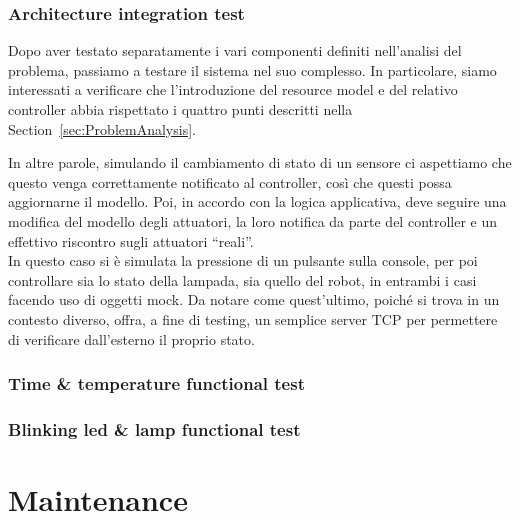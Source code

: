 \documentclass{../llncs}
\newcommand{\labelsec}[1]{\label{sec:#1}}
\newcommand{\xs}[1]{\sectionname~\ref{sec:#1}}
\newcommand{\sectionname}{Section}
\begin{document}


\subsubsection{Architecture integration test}
Dopo aver testato separatamente i vari componenti definiti nell'analisi del problema, passiamo a testare il sistema nel suo complesso. In particolare, siamo interessati a verificare che l'introduzione del resource model e del relativo controller abbia rispettato i quattro punti descritti nella \xs{ProblemAnalysis}.

In altre parole, simulando il cambiamento di stato di un sensore ci aspettiamo che questo venga correttamente notificato al controller, così che questi possa aggiornarne il modello. Poi, in accordo con la logica applicativa, deve seguire una modifica del modello degli attuatori, la loro notifica da parte del controller e un effettivo riscontro sugli attuatori ``reali''.\\



In questo caso si è simulata la pressione di un pulsante sulla console, per poi controllare sia lo stato della lampada, sia quello del robot, in entrambi i casi facendo uso di oggetti mock. Da notare come quest'ultimo, poiché si trova in un contesto diverso, offra, a fine di testing, un semplice server TCP per permettere di verificare dall'esterno il proprio stato.

\subsubsection{Time \& temperature functional test}


\subsubsection{Blinking led \& lamp functional test}



\section{Maintenance}
\labelsec{Maintenance}
\end{document}
